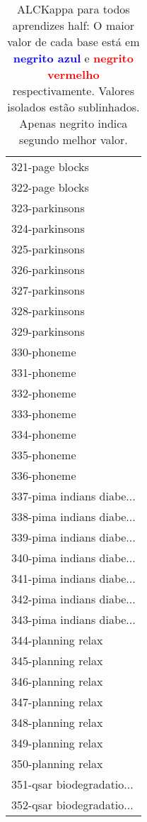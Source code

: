 \begin{table}[h]
\caption{ALCKappa para todos aprendizes half: O maior valor de cada base está em \textcolor{blue}{\textbf{negrito azul}} e \textcolor{red}{\textbf{negrito vermelho}} respectivamente. Valores isolados estão sublinhados. Apenas negrito indica segundo melhor valor.}
\begin{center}\begin{tabular}{l}
 & \\ \hline 321-page blocks &  \\
322-page blocks &  \\
323-parkinsons &  \\
324-parkinsons &  \\
325-parkinsons &  \\
326-parkinsons &  \\
327-parkinsons &  \\ \hline
328-parkinsons &  \\
329-parkinsons &  \\
330-phoneme &  \\
331-phoneme &  \\
332-phoneme &  \\
333-phoneme &  \\
334-phoneme &  \\ \hline
335-phoneme &  \\
336-phoneme &  \\
337-pima indians diabe... &  \\
338-pima indians diabe... &  \\
339-pima indians diabe... &  \\
340-pima indians diabe... &  \\
341-pima indians diabe... &  \\ \hline
342-pima indians diabe... &  \\
343-pima indians diabe... &  \\
344-planning relax &  \\
345-planning relax &  \\
346-planning relax &  \\
347-planning relax &  \\
348-planning relax &  \\ \hline
349-planning relax &  \\
350-planning relax &  \\
351-qsar biodegradatio... &  \\
352-qsar biodegradatio... &  \\\end{tabular}\label{stratsALCKappa10AllReduxb}
\end{center}
\end{table}
